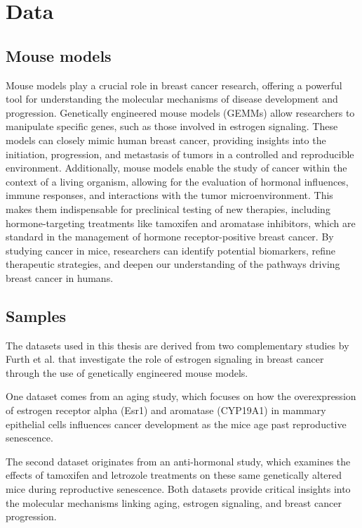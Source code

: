 \section{Data}
\label{sec:data}

\subsection{Mouse models}
Mouse models play a crucial role in breast cancer research, offering a powerful
tool for understanding the molecular mechanisms of disease development and
progression.
Genetically engineered mouse models (GEMMs) allow researchers to manipulate
specific genes, such as those involved in estrogen
signaling\supercite{park_mouse_2018}.
These models can closely mimic human breast cancer, providing insights into the
initiation, progression, and metastasis of tumors in a controlled and
reproducible environment\supercite{pfefferle_transcriptomic_2013}.
Additionally, mouse models enable the study of cancer within the context of a
living organism, allowing for the evaluation of hormonal influences, immune
responses, and interactions with the tumor
microenvironment\supercite{manning_mouse_2016}.
This makes them indispensable for preclinical testing of new therapies,
including hormone-targeting treatments like tamoxifen and aromatase inhibitors,
which are standard in the management of hormone receptor-positive breast
cancer\supercite{fan_endocrine_2015,yin_disruption_2014}.
By studying cancer in mice, researchers can identify potential biomarkers,
refine therapeutic strategies, and deepen our understanding of the pathways
driving breast cancer in humans\supercite{peterson_amphiregulin_2015}.

\subsection{Samples}
The datasets used in this thesis are derived from two complementary studies by
Furth et al.
\supercite{furth_esr1_2023,furth_overexpression_2023}
that investigate the role of estrogen signaling in breast cancer through the
use of genetically engineered mouse models.

One dataset comes from an aging study, which focuses on how the overexpression
of estrogen receptor alpha (Esr1) and aromatase (CYP19A1) in mammary epithelial
cells influences cancer development as the mice age past reproductive
senescence.

The second dataset originates from an anti-hormonal study, which examines the
effects of tamoxifen and letrozole treatments on these same genetically altered
mice during reproductive senescence.
Both datasets provide critical insights into the molecular mechanisms linking
aging, estrogen signaling, and breast cancer progression.


